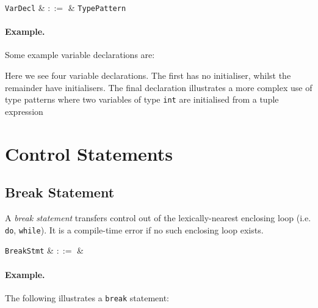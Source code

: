 \begin{syntax}
  \verb+VarDecl+ & $::=$ & \verb+TypePattern+\ \big[\
  \token{=}\ \verb+Expr+\ \big]\\
\end{syntax}

\paragraph{Example.} Some example variable declarations are:



Here we see four variable declarations.  The first has no initialiser, whilst the remainder have initialisers.  The final declaration illustrates a more complex use of type patterns where two variables of type \lstinline{int} are initialised from a tuple expression


\section{Control Statements}


\subsection{Break Statement}
\label{c_stmts_break}
A {\em break statement} transfers control out of the lexically-nearest enclosing loop (i.e. \lstinline{do}, \lstinline{while}).  It is a compile-time error if no such enclosing loop exists.

\begin{syntax}
  \verb+BreakStmt+ & $::=$ & \\
\end{syntax}

\paragraph{Example.} The following illustrates a \lstinline{break} statement:




